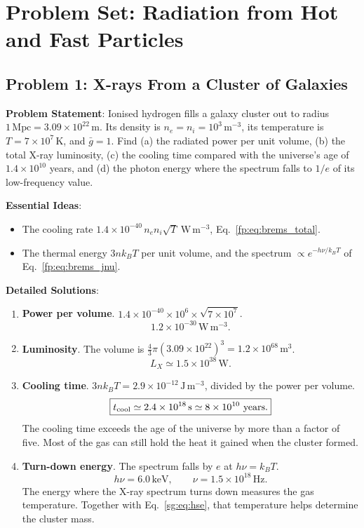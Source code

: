 \section{Problem Set: Radiation from Hot and Fast Particles}

\subsection{Problem 1: X-rays From a Cluster of Galaxies}
\label{fp:prob:cluster}

\textbf{Problem Statement}: Ionised hydrogen fills a galaxy cluster out to radius $1\,\mathrm{Mpc}=3.09\times10^{22}\,\mathrm m$. Its density is $n_e=n_i=10^3\,\mathrm{m^{-3}}$, its temperature is $T=7\times10^7\,\mathrm K$, and $\bar g=1$. Find (a) the radiated power per unit volume, (b) the total X-ray luminosity, (c) the cooling time compared with the universe's age of $1.4\times10^{10}$ years, and (d) the photon energy where the spectrum falls to $1/e$ of its low-frequency value.

\textbf{Essential Ideas}:
\begin{itemize}
	\item The cooling rate $1.4\times10^{-40}\,n_en_i\sqrt T\ \mathrm{W\,m^{-3}}$, Eq.~\eqref{fp:eq:brems_total}.
	\item The thermal energy $3nk_BT$ per unit volume, and the spectrum $\propto e^{-h\nu/k_BT}$ of Eq.~\eqref{fp:eq:brems_jnu}.
\end{itemize}

\textbf{Detailed Solutions}:
\begin{enumerate}[label=(\alph*)]
	\item \textbf{Power per volume}. $1.4\times10^{-40}\times10^6\times\sqrt{7\times10^7}$.
	\[
	\boxed{1.2\times10^{-30}\,\mathrm{W\,m^{-3}}.}
	\]
	\item \textbf{Luminosity}. The volume is $\tfrac43\pi(3.09\times10^{22})^3=1.2\times10^{68}\,\mathrm{m^3}$.
	\[
	\boxed{L_X\simeq1.5\times10^{38}\,\mathrm W.}
	\]
	\item \textbf{Cooling time}. $3nk_BT=2.9\times10^{-12}\,\mathrm{J\,m^{-3}}$, divided by the power per volume.
	\[
	\boxed{t_{\rm cool}\simeq2.4\times10^{18}\,\mathrm s\simeq8\times10^{10}\ \text{years}.}
	\]
	The cooling time exceeds the age of the universe by more than a factor of five. Most of the gas can still hold the heat it gained when the cluster formed.
	\item \textbf{Turn-down energy}. The spectrum falls by $e$ at $h\nu=k_BT$.
	\[
	\boxed{h\nu=6.0\,\mathrm{keV},\qquad \nu=1.5\times10^{18}\,\mathrm{Hz}.}
	\]
	The energy where the X-ray spectrum turns down measures the gas temperature. Together with Eq.~\eqref{sg:eq:hse}, that temperature helps determine the cluster mass.
\end{enumerate}


